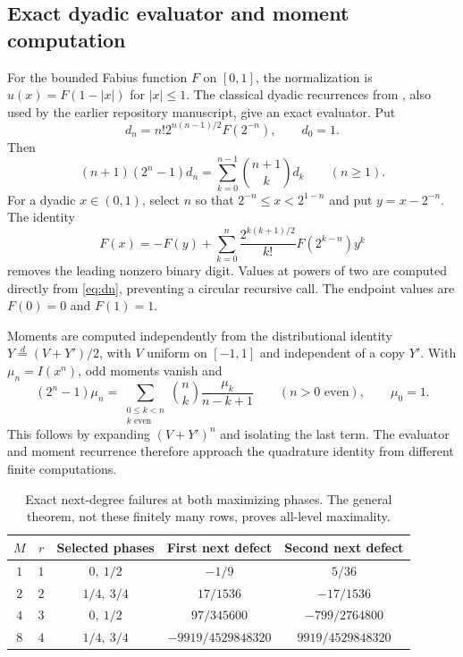 \documentclass[11pt,a4paper]{article}
\numberwithin{equation}{section}
\theoremstyle{plain}
\theoremstyle{definition}
\theoremstyle{remark}
\begin{document}
\subsection{Exact dyadic evaluator and moment computation}

For the bounded Fabius function $F$ on $[0,1]$, the normalization is
$u(x)=F(1-|x|)$ for $|x|\le1$. The classical dyadic recurrences from
\cite{arias2017}, also used by the earlier repository manuscript, give an
exact evaluator. Put
\begin{equation}\label{eq:dn}
 d_n=n!2^{n(n-1)/2}F(2^{-n}),\qquad d_0=1.
\end{equation}
Then
\begin{equation}\label{eq:drec}
 (n+1)(2^n-1)d_n=\sum_{k=0}^{n-1}\binom{n+1}{k}d_k\qquad(n\ge1).
\end{equation}
For a dyadic $x\in(0,1)$, select $n$ so that
$2^{-n}\le x<2^{1-n}$ and put $y=x-2^{-n}$. The identity
\begin{equation}\label{eq:Frec}
 F(x)=-F(y)+\sum_{k=0}^{n}
 \frac{2^{k(k+1)/2}}{k!}F(2^{k-n})y^k
\end{equation}
removes the leading nonzero binary digit. Values at powers of two are
computed directly from \eqref{eq:dn}, preventing a circular recursive
call. The endpoint values are $F(0)=0$ and $F(1)=1$.

Moments are computed independently from the distributional identity
$Y\overset d=(V+Y')/2$, with $V$ uniform on $[-1,1]$ and independent
of a copy $Y'$. With $\mu_n=I(x^n)$, odd moments vanish and
\begin{equation}\label{eq:moments}
 (2^n-1)\mu_n=
 \sum_{\substack{0\le k<n\\k\text{ even}}}
 \binom nk\frac{\mu_k}{n-k+1}
 \qquad(n>0\text{ even}),\qquad\mu_0=1.
\end{equation}
This follows by expanding $(V+Y')^n$ and isolating the last term.
The evaluator and moment recurrence therefore approach the quadrature
identity from different finite computations.

\begin{table}[htbp]
\centering
\caption{Exact next-degree failures at both maximizing phases. The general
theorem, not these finitely many rows, proves all-level maximality.}
\label{tab:exact}
\renewcommand{\arraystretch}{1.4}
\begin{tabular}{@{}ccccc@{}}
\toprule
$M$ & $r$ & Selected phases & First next defect & Second next defect\\
\midrule
$1$ & $1$ & $0,\ 1/2$ & $-1/9$ & $5/36$\\
$2$ & $2$ & $1/4,\ 3/4$ & $17/1536$ & $-17/1536$\\
$4$ & $3$ & $0,\ 1/2$ & $97/345600$ & $-799/2764800$\\
$8$ & $4$ & $1/4,\ 3/4$ & $-9919/4529848320$ & $9919/4529848320$\\
\bottomrule
\end{tabular}
\end{table}
\end{document}
